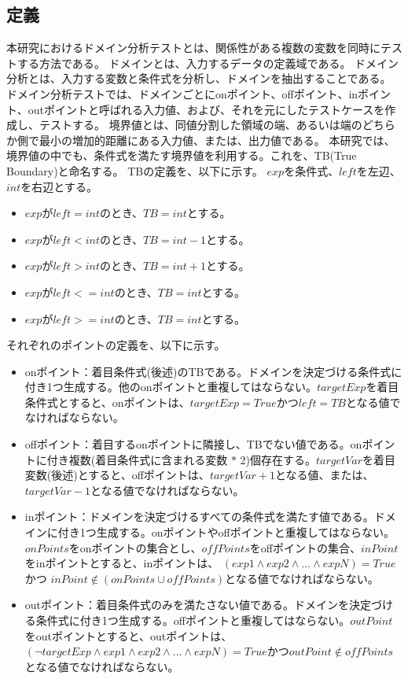 \documentclass[uplatex, report, a4j, 10pt]{jsbook}
\begin{document}
\subsection{定義}\label{sec:define}
本研究におけるドメイン分析テストとは、関係性がある複数の変数を同時にテストする方法である\cite{izon}\cite{jstqb}。
ドメインとは、入力するデータの定義域である。
ドメイン分析とは、入力する変数と条件式を分析し、ドメインを抽出することである。
ドメイン分析テストでは、ドメインごとにonポイント、offポイント、inポイント、outポイントと呼ばれる入力値、および、それを元にしたテストケースを作成し、テストする。
境界値とは、同値分割した領域の端、あるいは端のどちらか側で最小の増加的距離にある入力値、または、出力値である\cite{jstqb}。
本研究では、境界値の中でも、条件式を満たす境界値を利用する。これを、TB(True Boundary)と命名する。
TBの定義を、以下に示す。
$exp$を条件式、$left$を左辺、$int$を右辺とする。
\begin{itemize}
  \item $exp$が$left = int$のとき、$TB = int$とする。
  \item $exp$が$left < int$のとき、$TB = int - 1$とする。
  \item $exp$が$left > int$のとき、$TB = int + 1$とする。
  \item $exp$が$left <= int$のとき、$TB = int$とする。
  \item $exp$が$left >= int$のとき、$TB = int$とする。
\end{itemize}
それぞれのポイントの定義を、以下に示す。
\begin{itemize}
  \item onポイント：着目条件式(後述)のTBである。ドメインを決定づける条件式に付き1つ生成する。他のonポイントと重複してはならない。$targetExp$を着目条件式とすると、onポイントは、$targetExp = True$かつ$left = TB$となる値でなければならない。
  \item offポイント：着目するonポイントに隣接し、TBでない値である。onポイントに付き複数(着目条件式に含まれる変数 $*$ 2)個存在する。$targetVar$を着目変数(後述)とすると、offポイントは、$targetVar + 1$となる値、または、$targetVar - 1$となる値でなければならない。
  \item inポイント：ドメインを決定づけるすべての条件式を満たす値である。ドメインに付き1つ生成する。onポイントやoffポイントと重複してはならない。$onPoints$をonポイントの集合とし、$offPoints$をoffポイントの集合、$inPoint$をinポイントとすると、inポイントは、 $(exp1 \land exp2 \land ... \land expN) = True$ かつ $inPoint \notin (onPoints \cup offPoints)$となる値でなければならない。
  \item outポイント：着目条件式のみを満たさない値である。ドメインを決定づける条件式に付き1つ生成する。offポイントと重複してはならない。$outPoint$をoutポイントとすると、outポイントは、$ (\lnot targetExp \land exp1 \land exp2 \land ... \land expN) = True$かつ$outPoint \notin offPoints$となる値でなければならない。
\end{itemize}
\end{document}
